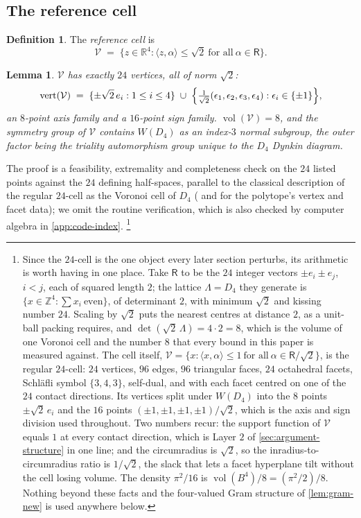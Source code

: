 \documentclass[11pt,reqno]{amsart}
\renewcommand{\_}{\origunderscore\allowbreak}
\numberwithin{equation}{section}
\theoremstyle{plain}
\newtheorem{lem}[thm]{Lemma}
\theoremstyle{definition}
\newtheorem{definition}[thm]{Definition}
\theoremstyle{remark}
\newcommand{\Rt}{\mathsf{R}}                 %
\newcommand{\Latt}{\Lambda}                  %
\newcommand{\VCell}{\mathcal{V}}             %
\DeclareMathOperator{\vol}{vol}
\begin{document}
\subsection{The reference cell}

\begin{definition}\label{def:refcell-new}
The \emph{reference cell} is
\[
  \VCell \;=\; \bigl\{z\in\mathbb{R}^4 : \langle z,\alpha\rangle\le\sqrt2
  \ \text{for all}\ \alpha\in\Rt\bigr\}.
\]
\end{definition}

\begin{lem}\label{lem:refcell-vol}
$\VCell$ has exactly $24$ vertices, all of norm $\sqrt2$:
\[
  \mathrm{vert}(\VCell) \;=\;
  \{\pm\sqrt2\,e_i : 1\le i\le4\} \;\cup\;
  \Bigl\{\tfrac{1}{\sqrt2}(\epsilon_1,\epsilon_2,\epsilon_3,\epsilon_4) :
  \epsilon_i\in\{\pm1\}\Bigr\},
\]
an $8$-point axis family and a $16$-point sign family. $\vol(\VCell)=8$,
and the symmetry group of $\VCell$ contains $W(D_4)$ as an index-$3$
normal subgroup, the outer factor being the triality automorphism
group unique to the $D_4$ Dynkin diagram.
\end{lem}

The proof is a feasibility, extremality and completeness check on the
$24$ listed points against the $24$ defining half-spaces, parallel to
the classical description of the regular $24$-cell as the Voronoi cell
of $D_4$ (\cite[Ch.~VIII]{Cox73} and \cite[Ch.~4]{CS1988} for the
polytope's vertex and facet data); we omit the routine verification,
which is also checked by computer algebra in \cref{app:code-index}.%
\footnote{Since the $24$-cell is the one object every later section
  perturbs, its arithmetic is worth having in one place. Take $\Rt$ to
  be the $24$ integer vectors $\pm e_i\pm e_j$, $i<j$, each of squared
  length $2$; the lattice $\Latt=D_4$ they generate is
  $\{x\in\mathbb{Z}^4:\sum x_i\ \text{even}\}$, of determinant $2$, with
  minimum $\sqrt2$ and kissing number $24$. Scaling by $\sqrt2$ puts the
  nearest centres at distance $2$, as a unit-ball packing requires, and
  $\det(\sqrt2\,\Latt)=4\cdot2=8$, which is the volume of one Voronoi
  cell and the number $8$ that every bound in this paper is measured
  against. The cell itself, $\VCell=\{x:\langle
  x,\alpha\rangle\le1\ \text{for all}\ \alpha\in\Rt/\sqrt2\}$, is the
  regular $24$-cell: $24$ vertices, $96$ edges, $96$ triangular faces,
  $24$ octahedral facets, Schl\"afli symbol $\{3,4,3\}$, self-dual, and
  with each facet centred on one of the $24$ contact directions. Its
  vertices split under $W(D_4)$ into the $8$ points $\pm\sqrt2\,e_i$ and
  the $16$ points $(\pm1,\pm1,\pm1,\pm1)/\sqrt2$, which is the axis and
  sign division used throughout. Two numbers recur: the support function
  of $\VCell$ equals $1$ at every contact direction, which is Layer $2$
  of \cref{sec:argument-structure} in one line; and the circumradius is
  $\sqrt2$, so the inradius-to-circumradius ratio is
  $1/\sqrt2$, the slack that lets a facet hyperplane tilt without the
  cell losing volume. The density $\pi^2/16$ is
  $\vol(B^4)/8=(\pi^2/2)/8$. Nothing beyond these facts and the
  four-valued Gram structure of \cref{lem:gram-new} is used
  anywhere below.}
\end{document}
